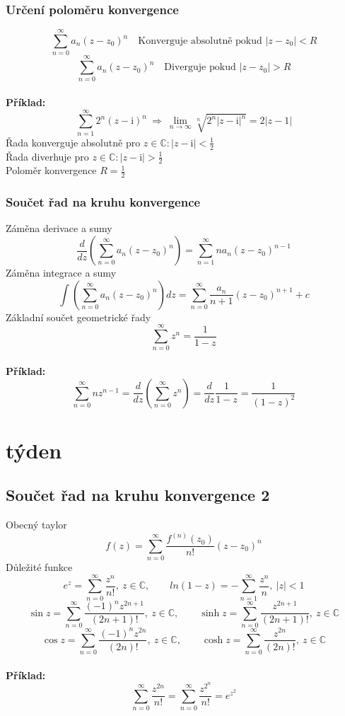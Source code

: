 \documentclass{article}
\newcommand{\mi}{\mathrm{i}}
\begin{document}
            \subsubsection*{Určení poloměru konvergence}
            \[\sum_{n=0}^\infty a_n(z-z_0)^n\quad \mbox{Konverguje absolutně pokud }|z-z_0|<R\]
            \[\sum_{n=0}^\infty a_n(z-z_0)^n\quad \mbox{Diverguje pokud }|z-z_0|>R\]
            \\
            {\bf Příklad:}
            \[\sum_{n=1}^{\infty}2^n(z-\mi)^n\:\Rightarrow\:\lim_{n\to\infty}\sqrt[n]{2^n|z-\mi|^n}
            =2|z-1|\]
            Řada konverguje absolutně pro $z\in\mathbb{C}:|z-\mi|<\frac{1}{2}$\\
            Řada diverhuje pro $z\in\mathbb{C}:|z-\mi|>\frac{1}{2}$\\
            Poloměr konvergence $R=\frac{1}{2}$
            \subsubsection*{Součet řad na kruhu konvergence}
                Záměna derivace a sumy
                    \[\frac{d}{dz}\left(\sum_{n=0}^\infty a_n(z-z_0)^n\right)=
                    \sum_{n=1}^\infty na_n(z-z_0)^{n-1}\]
                Záměna integrace a sumy
                    \[\int \left(\sum_{n=0}^{\infty}a_n(z-z_0)^n\right)dz=
                    \sum_{n=0}^{\infty}\frac{a_n}{n+1}(z-z_0)^{n+1}+c\]
                Základní součet geometrické řady
                    \[\sum_{n=0}^{\infty}z^n=\frac{1}{1-z}\]
                \\
                {\bf Příklad:}
                \[\sum_{n=0}^{\infty}nz^{n-1}=
                \frac{d}{dz}\left(\sum_{n=0}^{\infty}z^{n}\right)=
                \frac{d}{dz}\frac{1}{1-z}=\frac{1}{(1-z)^2}\]


    \section{týden}
        \subsection{Součet řad na kruhu konvergence 2}
            Obecný taylor
                \[f(z)=\sum_{n=0}^{\infty}\frac{f^{(n)}(z_0)}{n!}(z-z_0)^n\]
            Důležité funkce
                \[e^z=\sum_{n=0}^{\infty}\frac{z^n}{n!},\:z\in\mathbb{C},\qquad
                ln(1-z)=-\sum_{n=1}^{\infty}\frac{z^n}{n},\:|z|<1\]
                \[\sin z =\sum_{n=0}^{\infty}\frac{(-1)^nz^{2n+1}}{(2n+1)!},\:z\in\mathbb{C},\qquad
                \sinh z =\sum_{n=0}^{\infty}\frac{z^{2n+1}}{(2n+1)!},\:z\in\mathbb{C}\]
                \[\cos z =\sum_{n=0}^{\infty}\frac{(-1)^nz^{2n}}{(2n)!},\:z\in\mathbb{C},\qquad
                \cosh z =\sum_{n=0}^{\infty}\frac{z^{2n}}{(2n)!},\:z\in\mathbb{C}\]
                \\
                {\bf Příklad:}
                \[\sum_{n=0}^{\infty}\frac{z^{2n}}{n!}=
                \sum_{n=0}^{\infty}\frac{z^{2^{n}}}{n!}=e^{z^2}\]
\end{document}
